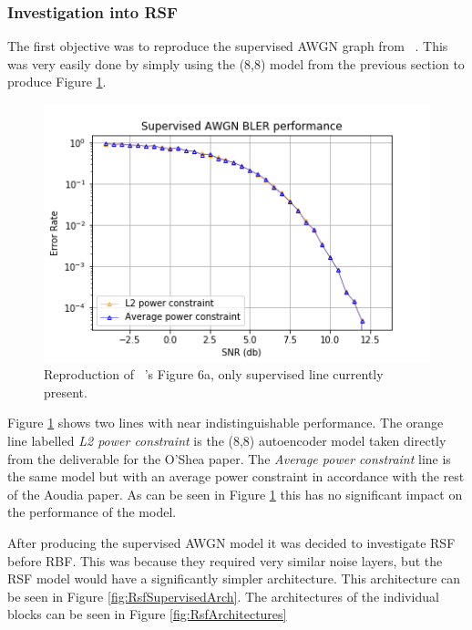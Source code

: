 \documentclass[12pt,onecolumn,letterpaper]{article}
\newcommand\genfigsize{0.5}
\begin{document}
\subsubsection{Investigation into RSF}
\label{sec:InvestigateRsf}

The first objective was to reproduce the supervised AWGN graph from ~\cite{Aoudia}. This was very easily done by simply using the (8,8) model from the previous section to produce Figure \ref{fig:AwgnSupervised}.

\begin{figure}
   \centering
   \includegraphics[width=\genfigsize\linewidth]{figures/aoudia_paper/awgn_supervised.png}
   \caption{Reproduction of ~\cite{Aoudia}'s Figure 6a, only supervised line currently present.}
   \label{fig:AwgnSupervised}
\end{figure}

Figure \ref{fig:AwgnSupervised} shows two lines with near indistinguishable performance. The orange line labelled \textit{L2 power constraint} is the (8,8) autoencoder model taken directly from the deliverable for the O'Shea paper. The \textit{Average power constraint} line is the same model but with an average power constraint in accordance with the rest of the Aoudia paper. As can be seen in Figure \ref{fig:AwgnSupervised} this has no significant impact on the performance of the model. 

After producing the supervised AWGN model it was decided to investigate RSF before RBF. This was because they required very similar noise layers, but the RSF model would have a significantly simpler architecture. This architecture can be seen in Figure \ref{fig:RsfSupervisedArch}. The architectures of the individual blocks can be seen in Figure \ref{fig:RsfArchitectures}
\end{document}
